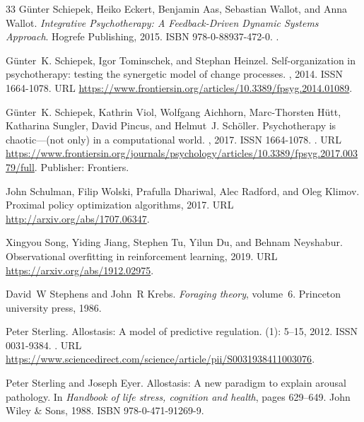 \documentclass[12pt,fleqn]{article}
\begin{document}
\begin{thebibliography}{33}
  G\"unter Schiepek, Heiko Eckert, Benjamin Aas, Sebastian Wallot, and Anna
  Wallot.
  \newblock \emph{Integrative Psychotherapy: A Feedback-Driven Dynamic Systems
    Approach}.
  \newblock Hogrefe Publishing, 2015.
  \newblock ISBN 978-0-88937-472-0.
  \newblock {}.

  G\"unter~K. Schiepek, Igor Tominschek, and Stephan Heinzel.
  \newblock Self-organization in psychotherapy: testing the synergetic model of
  change processes.
  , 2014.
  \newblock ISSN 1664-1078.
  \newblock URL
  \url{https://www.frontiersin.org/articles/10.3389/fpsyg.2014.01089}.

  G\"unter~K. Schiepek, Kathrin Viol, Wolfgang Aichhorn, Marc-Thorsten H\"utt,
  Katharina Sungler, David Pincus, and Helmut~J. Sch\"oller.
  \newblock Psychotherapy is chaotic---(not only) in a computational world.
  , 2017.
  \newblock ISSN 1664-1078.
  \newblock {}.
  \newblock URL
  \url{https://www.frontiersin.org/journals/psychology/articles/10.3389/fpsyg.2017.00379/full}.
  \newblock Publisher: Frontiers.

  John Schulman, Filip Wolski, Prafulla Dhariwal, Alec Radford, and Oleg Klimov.
  \newblock Proximal policy optimization algorithms, 2017.
  \newblock URL \url{http://arxiv.org/abs/1707.06347}.

  Xingyou Song, Yiding Jiang, Stephen Tu, Yilun Du, and Behnam Neyshabur.
  \newblock Observational overfitting in reinforcement learning, 2019.
  \newblock URL \url{https://arxiv.org/abs/1912.02975}.

  David~W Stephens and John~R Krebs.
  \newblock \emph{Foraging theory}, volume~6.
  \newblock Princeton university press, 1986.

  Peter Sterling.
  \newblock Allostasis: A model of predictive regulation.
   (1): 5--15, 2012.
  \newblock ISSN 0031-9384.
  \newblock {}.
  \newblock URL
  \url{https://www.sciencedirect.com/science/article/pii/S0031938411003076}.

  Peter Sterling and Joseph Eyer.
  \newblock Allostasis: A new paradigm to explain arousal pathology.
  \newblock In \emph{Handbook of life stress, cognition and health}, pages
  629--649. John Wiley \& Sons, 1988.
  \newblock ISBN 978-0-471-91269-9.


\end{thebibliography}
\end{document}
